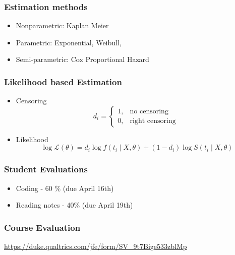 \documentclass{beamer}
\newcommand{\Lik}{\mathcal{L}}
\newcommand{\1}{\mathbb{1}}
\begin{document}
\begin{frame}\frametitle{Estimation methods}
\begin{itemize}
\item Nonparametric: Kaplan Meier
\item Parametric: Exponential, Weibull,
\item Semi-parametric: Cox Proportional Hazard
\end{itemize}
\end{frame}

\begin{frame}\frametitle{Likelihood based Estimation}
\begin{itemize}
\item Censoring
\begin{equation}
d_i = \begin{cases} 1, & \mbox{no censoring} \\ 0, & \mbox{right censoring } \end{cases}
\end{equation}
\item Likelihood
\begin{equation}
\log \Lik(\theta) = d_i \log f(t_i \mid X,\theta) + (1-d_i) \log S(t_i \mid X,\theta)
\end{equation}
\end{itemize}
\end{frame}

\begin{frame}\frametitle{Student Evaluations}
\begin{itemize}
\item Coding - 60 \% (due April 16th)
\item Reading notes - 40\% (due April 19th)
\end{itemize}
\end{frame}


\begin{frame}\frametitle{Course Evaluation}
\url{https://duke.qualtrics.com/jfe/form/SV_9t7Bige533zblMp}
\end{frame}
\end{document}
